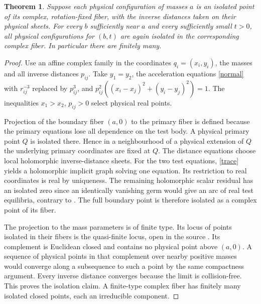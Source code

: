 \documentclass[11pt]{article}
\newtheorem{theorem}{Theorem}
\begin{document}
\begin{theorem}\label{transfer}
Suppose each physical configuration of masses $a$ is an isolated point of its complex, rotation-fixed fiber, with the inverse distances taken on their physical sheets. For every $b$ sufficiently near $a$ and every sufficiently small $t>0$, all physical configurations for $(b,t)$ are again isolated in the corresponding complex fiber. In particular there are finitely many.
\end{theorem}
\begin{proof}
Use an affine complex family in the coordinates $q_i=(x_i,y_i)$, the masses and all inverse distances $p_{ij}$. Take $y_1=y_2$, the acceleration equations \eqref{normal} with $r_{ij}^{-3}$ replaced by $p_{ij}^3$, and
$p_{ij}^2((x_i-x_j)^2+(y_i-y_j)^2)=1$. The inequalities $x_1>x_2$, $p_{ij}>0$ select physical real points.

Projection of the boundary fiber $(a,0)$ to the primary fiber is defined because the primary equations lose all dependence on the test body. A physical primary point $Q$ is isolated there. Hence in a neighbourhood of a physical extension of $Q$ the underlying primary coordinates are fixed at $Q$. The distance equations choose local holomorphic inverse-distance sheets. For the two test equations, \eqref{trace} yields a holomorphic implicit graph solving one equation. Its restriction to real coordinates is real by uniqueness. The remaining holomorphic scalar residual has an isolated zero since an identically vanishing germ would give an arc of real test equilibria, contrary to \cite{hj}. The full boundary point is therefore isolated as a complex point of its fiber.

The projection to the mass parameters is of finite type. Its locus of points isolated in their fibers is the quasi-finite locus, open in the source \cite{stacks}. Its complement is Euclidean closed and contains no physical point above $(a,0)$. A sequence of physical points in that complement over nearby positive masses would converge along a subsequence to such a point by the same compactness argument. Every inverse distance converges because the limit is collision-free. This proves the isolation claim. A finite-type complex fiber has finitely many isolated closed points, each an irreducible component.
\end{proof}
\end{document}
